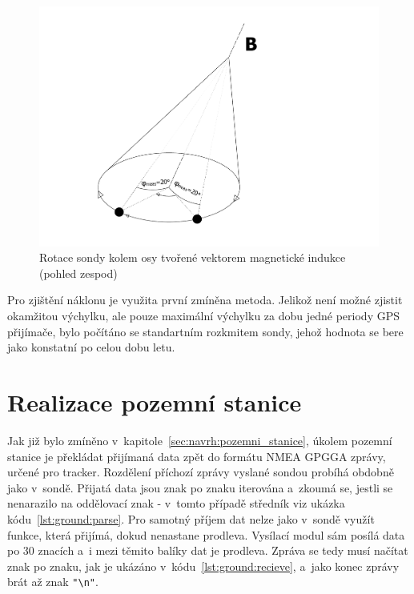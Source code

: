 \documentclass[twoside]{ctuthesis}
\theoremstyle{plain}
\theoremstyle{definition}
\theoremstyle{note}
\begin{document}
		\begin{figure}[hbtp]
			\centering
			\includegraphics[width=.5\textwidth]{Figures/sonda_naklon_mag_osova_rotace.pdf}
			\caption{Rotace sondy kolem osy tvořené vektorem magnetické indukce (pohled zespod)}
			\label{fig:sonda:mag:rot}
		\end{figure}

		Pro zjištění náklonu je využita první zmíněna metoda. Jelikož není možné zjistit okamžitou výchylku, ale pouze maximální výchylku za dobu jedné periody GPS přijímače, bylo počítáno se standartním rozkmitem sondy, jehož hodnota se bere jako konstatní po celou dobu letu. 
		


	












	
	\section{Realizace pozemní stanice}

	Jak již bylo zmíněno v~kapitole~\ref{sec:navrh:pozemni_stanice}, úkolem pozemní stanice je překládat přijímaná data zpět do formátu NMEA GPGGA zprávy, určené pro tracker. Rozdělení příchozí zprávy vyslané sondou probíhá obdobně jako v~sondě. Přijatá data jsou znak po znaku iterována a~zkoumá se, jestli se nenarazilo na oddělovací znak - v~tomto případě středník viz ukázka kódu~\ref{lst:ground:parse}. Pro samotný příjem dat nelze jako v~sondě využít funkce, která přijímá, dokud nenastane prodleva. Vysílací modul sám posílá data po 30 znacích a~i mezi těmito balíky dat je prodleva. Zpráva se tedy musí načítat znak po znaku, jak je ukázáno v~kódu~\ref{lst:ground:recieve}, a~jako konec zprávy brát až znak \lstinline |"\n"|.
\end{document}
